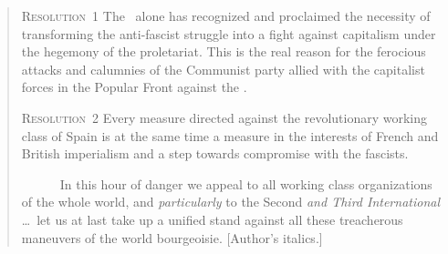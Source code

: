 \newpage

\begin{quote}
  \textsf{\textsc{Resolution~1}} \quad
  The \POUM\ alone has recognized and proclaimed the necessity of transforming the anti-fascist struggle into a fight against capitalism under the hegemony of the proletariat. This is the real reason for the ferocious attacks and calumnies of the Communist party allied with the capitalist forces in the Popular Front against the \POUM\kn.

  \textsf{\textsc{Resolution~2}} \quad
  Every measure directed against the revolutionary working class of Spain is at the same time a measure in the interests of French and British imperialism and a step towards compromise with the fascists.
  
  \baselineskip

  ~~~~~~In this hour of danger we appeal to all working class organizations of the whole world, and \emph{particularly} to the Second \emph{and Third International} \kp\dots\ let us at last take up a unified stand against all these treacherous maneuvers of the world bourgeoisie. [Author's italics.]
\end{quote}

